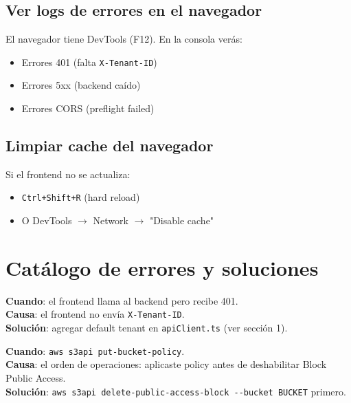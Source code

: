 \documentclass[11pt,a4paper,oneside]{article}
\begin{document}
\subsection{Ver logs de errores en el navegador}

El navegador tiene DevTools (F12). En la consola ver\'as:
\begin{itemize}
  \item Errores 401 (falta \texttt{X-Tenant-ID})
  \item Errores 5xx (backend ca\'ido)
  \item Errores CORS (preflight failed)
\end{itemize}

\subsection{Limpiar cache del navegador}

Si el frontend no se actualiza:
\begin{itemize}
  \item \texttt{Ctrl+Shift+R} (hard reload)
  \item O DevTools $\rightarrow$ Network $\rightarrow$ "Disable cache"
\end{itemize}

\section{Cat\'alogo de errores y soluciones}

\begin{tcolorbox}[colback=errred!5!white,colframe=errred,breakable,title={Error 1: 401 Unauthorized en todas las requests}]
\textbf{Cuando}: el frontend llama al backend pero recibe 401. \\
\textbf{Causa}: el frontend no env\'ia \texttt{X-Tenant-ID}. \\
\textbf{Soluci\'on}: agregar default tenant en \texttt{apiClient.ts} (ver secci\'on 1).
\end{tcolorbox}

\begin{tcolorbox}[colback=errred!5!white,colframe=errred,breakable,title={Error 2: BlockPublicPolicy setting prevents public policies}]
\textbf{Cuando}: \texttt{aws s3api put-bucket-policy}. \\
\textbf{Causa}: el orden de operaciones: aplicaste policy antes de deshabilitar Block Public Access. \\
\textbf{Soluci\'on}: \texttt{aws s3api delete-public-access-block -{}-bucket BUCKET} primero.
\end{tcolorbox}
\end{document}
